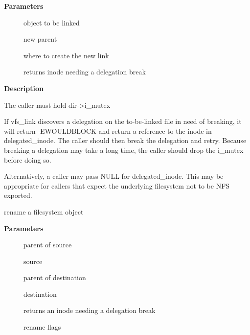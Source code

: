 \documentclass[a4paper,8pt,english]{sphinxmanual}
\begin{document}
\textbf{Parameters}
\begin{description}
\item[{}] \leavevmode
object to be linked

\item[{}] \leavevmode
new parent

\item[{}] \leavevmode
where to create the new link

\item[{}] \leavevmode
returns inode needing a delegation break

\end{description}

\textbf{Description}

The caller must hold dir-\textgreater{}i\_mutex

If vfs\_link discovers a delegation on the to-be-linked file in need
of breaking, it will return -EWOULDBLOCK and return a reference to the
inode in delegated\_inode.  The caller should then break the delegation
and retry.  Because breaking a delegation may take a long time, the
caller should drop the i\_mutex before doing so.

Alternatively, a caller may pass NULL for delegated\_inode.  This may
be appropriate for callers that expect the underlying filesystem not
to be NFS exported.

\begin{fulllineitems}
\label{filesystems/index:c.vfs_rename}
rename a filesystem object

\end{fulllineitems}


\textbf{Parameters}
\begin{description}
\item[{}] \leavevmode
parent of source

\item[{}] \leavevmode
source

\item[{}] \leavevmode
parent of destination

\item[{}] \leavevmode
destination

\item[{}] \leavevmode
returns an inode needing a delegation break

\item[{}] \leavevmode
rename flags

\end{description}
\end{document}

